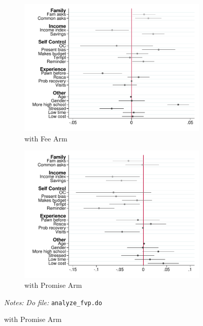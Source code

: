 \documentclass[11pt]{article}
\begin{document}
\begin{figure}[H]
    \caption{Predictors of commitment contract take-up}
    \label{interactions_takeup}
    \begin{center}
    \begin{subfigure}{0.45\textwidth}
        \caption{with Fee Arm}
        \centering
        \includegraphics[width=\textwidth]{Figuras/pago_frec_vol_fee_interactions_rf.pdf}
    \end{subfigure}
    \begin{subfigure}{0.45\textwidth}
        \caption{with Promise Arm}
        \centering
        \includegraphics[width=\textwidth]{Figuras/pago_frec_vol_promise_interactions_rf.pdf}
    \end{subfigure}
    \end{center}
     \footnotesize \textit{Notes: } 
      \footnotesize{ \textit{Do file: }  \texttt{analyze\_fvp.do}}
\end{figure}
\end{document}
